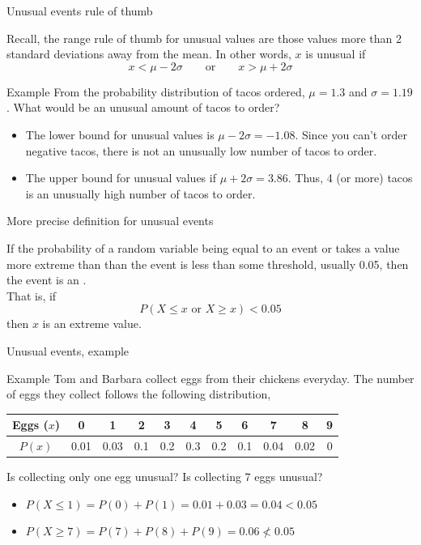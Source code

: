 \documentclass[xcolor=table, handout]{beamer}
\begin{document}
\begin{frame}{Unusual events rule of thumb}
\begin{block}{}
Recall, the range rule of thumb for unusual values are those values more than 2 standard deviations away from the mean. In other words, $x$ is unusual if
\[ x < \mu - 2\sigma \qquad \text{or} \qquad x > \mu + 2 \sigma\]
\end{block}
\pause
\begin{exampleblock}{Example}
From the probability distribution of tacos ordered, $\mu = 1.3$ and $\sigma = 1.19$. What would be an unusual amount of tacos to order?
\begin{itemize}
\pause\item The lower bound for unusual values is $\mu - 2\sigma = -1.08$. Since you can't order negative tacos, there is not an unusually low number of tacos to order.
\pause\item The upper bound for unusual values if $\mu + 2\sigma = 3.86$. Thus, 4 (or more) tacos is an unusually high number of tacos to order.
\end{itemize}
\end{exampleblock}
\end{frame}

\begin{frame}{More precise definition for unusual events}
\begin{block}{}
If the probability of a random variable being equal to an event or takes a value more extreme than than the event is less than some threshold, usually 0.05, then the event is an .\\
\medskip
\pause
That is, if 
\[P(X \le x \text{ or } X \ge x) < 0.05\]
then $x$ is an extreme value.
\end{block}
\end{frame}

\begin{frame}{Unusual events, example}
\begin{exampleblock}{Example}
Tom and Barbara collect eggs from their chickens everyday. The number of eggs they collect follows the following distribution,\\
\smallskip
{\centering
\begin{tabular}{c|cccccccccc}
Eggs ($x$) & 0 & 1 & 2 & 3 & 4 & 5 & 6 & 7 & 8 & 9 \\
\hline
$P(x)$ & 0.01 & 0.03 & 0.1 & 0.2 & 0.3 & 0.2 & 0.1 & 0.04 & 0.02 & 0
\end{tabular}\par
}
\medskip
Is collecting only one egg unusual? Is collecting 7 eggs unusual?
\begin{itemize}
\pause\item $P(X\le 1) = P(0) + P(1) = 0.01 + 0.03 = 0.04 < 0.05$
\pause\item $P(X \ge 7) = P(7) + P(8) + P(9) = 0.06 \not < 0.05$
\end{itemize}
\end{exampleblock}
\end{frame}
\end{document}
